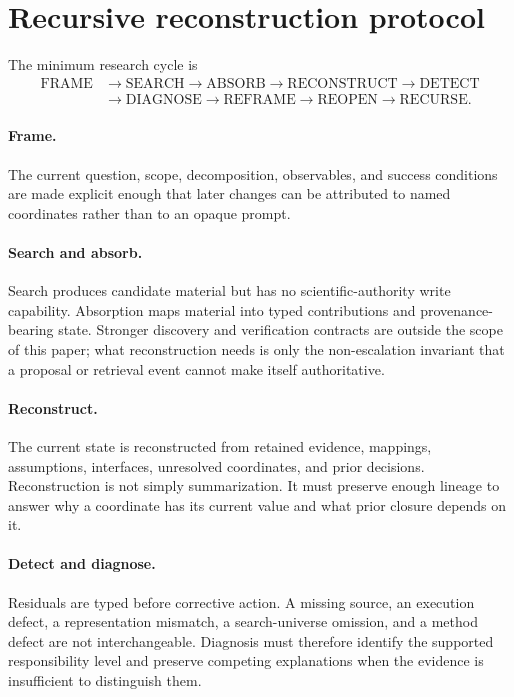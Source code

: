 \section{Recursive reconstruction protocol}

The minimum research cycle is
\[
\begin{aligned}
\mathrm{FRAME}&\rightarrow\mathrm{SEARCH}\rightarrow\mathrm{ABSORB}
\rightarrow\mathrm{RECONSTRUCT}\rightarrow\mathrm{DETECT}\\
&\rightarrow\mathrm{DIAGNOSE}\rightarrow\mathrm{REFRAME}
\rightarrow\mathrm{REOPEN}\rightarrow\mathrm{RECURSE}.
\end{aligned}
\]

\paragraph{Frame.}
The current question, scope, decomposition, observables, and success conditions are made explicit enough that later changes can be attributed to named coordinates rather than to an opaque prompt.

\paragraph{Search and absorb.}
Search produces candidate material but has no scientific-authority write capability. Absorption maps material into typed contributions and provenance-bearing state. Stronger discovery and verification contracts are outside the scope of this paper; what reconstruction needs is only the non-escalation invariant that a proposal or retrieval event cannot make itself authoritative.

\paragraph{Reconstruct.}
The current state is reconstructed from retained evidence, mappings, assumptions, interfaces, unresolved coordinates, and prior decisions. Reconstruction is not simply summarization. It must preserve enough lineage to answer why a coordinate has its current value and what prior closure depends on it.

\paragraph{Detect and diagnose.}
Residuals are typed before corrective action. A missing source, an execution defect, a representation mismatch, a search-universe omission, and a method defect are not interchangeable. Diagnosis must therefore identify the supported responsibility level and preserve competing explanations when the evidence is insufficient to distinguish them.

